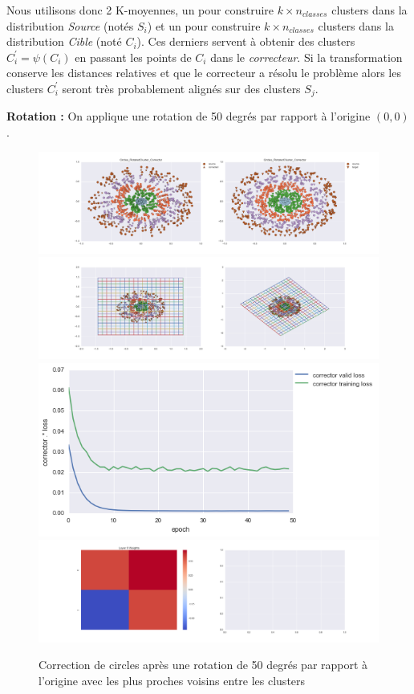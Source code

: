 Nous utilisons donc 2 K-moyennes, un pour construire $k\times n_{classes}$ clusters 
dans la distribution \emph{Source} (notés $S_i$) et un pour construire $k\times n_{classes}$ 
clusters dans la distribution \emph{Cible} (noté $C_i$). Ces derniers servent à obtenir 
des clusters $C_i^\prime = \psi(C_i)$ en passant les points de $C_i$ dans le \emph{correcteur}.
Si la transformation conserve les distances relatives et que le correcteur a résolu le problème
alors les clusters $C_i^\prime$ seront très probablement alignés sur des clusters $S_j$.

{\Large \textbf{Rotation :}} On applique une rotation de 50 degrés par rapport à l'origine $(0,0)$.

\begin{figure}[H] %
\centering
\includegraphics[width=\linewidth]{fig/24-05-2016/circles/Circles_RotatedCluster_Corrector-DATA.png}
\includegraphics[width=\linewidth]{fig/24-05-2016/circles/Circles_RotatedCluster_Corrector-GridCheck.png}
\includegraphics[width=0.45\linewidth]{fig/24-05-2016/circles/Circles_RotatedCluster_Corrector-Learning_curve.png}
\includegraphics[width=\linewidth]{fig/24-05-2016/circles/Circles_RotatedCluster_Corrector-W.png}
\caption{Correction de circles après une rotation de 50 degrés par rapport à l'origine avec les plus proches voisins entre les clusters}
\label{fig:recap-circles-rot-cluster}
\end{figure}


